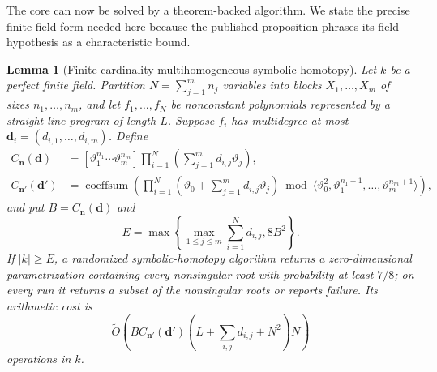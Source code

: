 \documentclass[11pt]{article}
\newtheorem{lemma}[lemma]{Lemma}
\begin{document}
The core can now be solved by a theorem-backed algorithm.  We state the precise
finite-field form needed here because the published proposition phrases its
field hypothesis as a characteristic bound.

\begin{lemma}[Finite-cardinality multihomogeneous symbolic homotopy]
\label{lem:finite-cardinality-homotopy}
Let $k$ be a perfect finite field.  Partition $N=\sum_{j=1}^m n_j$
variables into blocks $X_1,\ldots,X_m$ of sizes $n_1,\ldots,n_m$, and let
$f_1,\ldots,f_N$ be nonconstant polynomials represented by a straight-line
program of length $L$.  Suppose $f_i$ has multidegree at most
$\mathbf d_i=(d_{i,1},\ldots,d_{i,m})$.  Define
\begin{align}
 C_{\mathbf n}(\mathbf d)
 &= [\vartheta_1^{n_1}\cdots\vartheta_m^{n_m}]
    \prod_{i=1}^N\left(\sum_{j=1}^m d_{i,j}\vartheta_j\right),
 \label{eq:multihom-C}\\
 C_{\mathbf n'}(\mathbf d')
 &=\operatorname{coeffsum}\!\left(
   \prod_{i=1}^N\left(\vartheta_0+
        \sum_{j=1}^m d_{i,j}\vartheta_j\right)
   \bmod\langle\vartheta_0^2,
       \vartheta_1^{n_1+1},\ldots,\vartheta_m^{n_m+1}\rangle\right),
 \label{eq:multihom-Cplus}
\end{align}
and put $B=C_{\mathbf n}(\mathbf d)$ and
\begin{equation}\label{eq:finite-cardinality-threshold}
 E=\max\left\{
   \max_{1\le j\le m}\sum_{i=1}^N d_{i,j},
   8B^2
 \right\}.
\end{equation}
If $|k|\ge E$, a randomized symbolic-homotopy algorithm returns a
zero-dimensional parametrization containing every nonsingular root with
probability at least $7/8$; on every run it returns a subset of the
nonsingular roots or reports failure.  Its arithmetic cost is
\begin{equation}\label{eq:homotopy-soft-cost}
 \widetilde O\!\left(
 B C_{\mathbf n'}(\mathbf d')
 \left(L+\sum_{i,j}d_{i,j}+N^2\right)N
 \right)
\end{equation}
operations in $k$.
\end{lemma}
\end{document}

